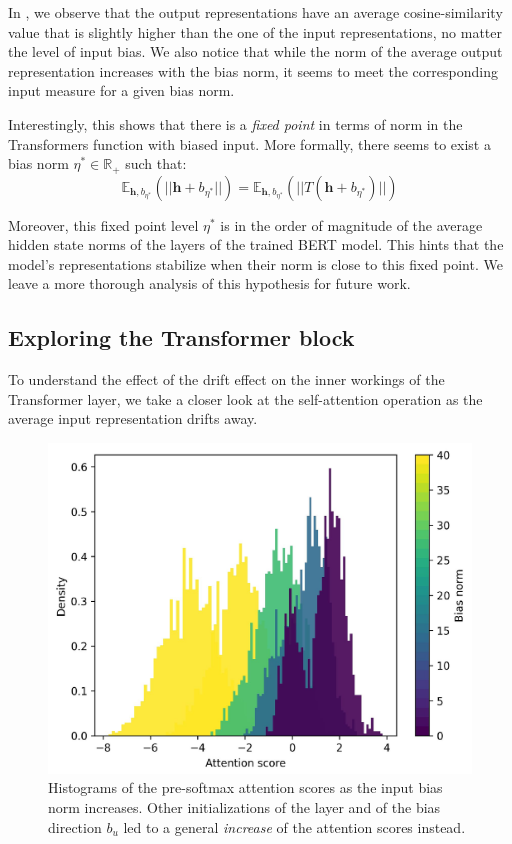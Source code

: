 In , we observe that the output representations have an average cosine-similarity value that is slightly higher than the one of the input representations, no matter the level of input bias. We also notice that while the norm of the average output representation increases with the bias norm, it seems to meet the corresponding input measure for a given bias norm.

Interestingly, this shows that there is a \textit{fixed point} in terms of norm in the Transformers function with biased input. More formally, there seems to exist a bias norm $\eta^* \in \mathbb{R}_+$ such that: $$\mathbb{E}_{\mathbf{h}, b_{\eta^*}}(||\mathbf{h} + b_{\eta^*}||) = \mathbb{E}_{\mathbf{h}, b_{\eta^*}}(||T(\mathbf{h} + b_{\eta^*})||)$$

Moreover, this fixed point level $\eta^*$ is in the order of magnitude of the average hidden state norms of the layers of the trained BERT model. This hints that the model's representations stabilize when their norm is close to this fixed point. We leave a more thorough analysis of this hypothesis for future work.

\subsection{Exploring the Transformer block}

To understand the effect of the drift effect on the inner workings of the Transformer layer, we take a closer look at the self-attention operation as the average input representation drifts away.

\begin{figure}[ht]
    \centering
    \includegraphics[width=0.5\linewidth]{sources/part_1/anisotropy/imgs/trained_bert_base_att_scores.pdf}
    \caption{Histograms of the pre-softmax attention scores as the input bias norm increases. Other initializations of the layer and of the bias direction $b_u$ led to a general \textit{increase} of the attention scores instead.}
    \label{fig:attscore_trained_transformer}
\end{figure}

